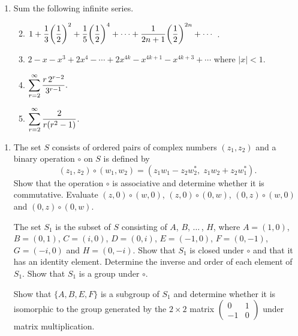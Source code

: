 \documentclass[a4, 11pt]{report}
\newlength{\qspace}
\newcounter{qnumber}
\newenvironment{question}%
 {\vspace{\qspace}
  \begin{enumerate}[\bfseries 1\quad][10]%
    \setcounter{enumi}{\value{qnumber}}%
    \item%
 }
{
  \end{enumerate}
  \filbreak
  \stepcounter{qnumber}
 }
\newenvironment{questionparts}[1][1]%
 {
  \begin{enumerate}[\bfseries (i)]%
    \setcounter{enumii}{#1}
    \addtocounter{enumii}{-1}
    \setlength{\itemsep}{5mm}
    \setlength{\parskip}{8pt}
 }
 {
  \end{enumerate}
 }
\begin{document}

\begin{question}
Sum the following infinite series.

\begin{questionparts}
	\item $\displaystyle 1 + 
{1 \over 3} \bigg({1\over 2}\bigg)^2 +{1 \over 5 }\bigg({1\over 2}\bigg)^4
+ \cdots + {1 \over 2n+1} \bigg({1 \over 2}\bigg)^{2n} + \cdots$ .

\item $\displaystyle 
2 -x -x^3 +2x^4 - \cdots + 2x^{4k} - x^{4k+1} - x^{4k+3} +\cdots$
where $|x|<1$.

\item  $\displaystyle  \sum _{r=2}^\infty
 {r\,  2^{r-2} \over 3^{r-1} }.$

\item $\displaystyle\sum_{r=2}^\infty
 {2 \over r(r^2-1) }$.
 \end{questionparts}
\end{question}


\begin{question}
The set $S$ consists of ordered pairs of complex numbers
$(z_1,z_2)$ and a binary operation  $\circ$ on $S$  is defined by
$$
(z_1,z_2)\circ(w_1,w_2)=
(z_1w_1-z_2w^*_2, \; z_1w_2+z_2w^*_1).
$$
Show that the operation $\circ$ is associative and determine whether
it is commutative. Evaluate $(z,0)\circ(w,0)$, $(z,0)\circ(0,w)$,
$(0,z)\circ(w,0)$ and $(0,z)\circ(0,w)$.

The set $S_1$ is the subset of $S$ consisting of $A$, $B$, $\ldots\,$, $H$,
where $A=(1,0)$, $B=(0,1)$, $C=(i,0)$, $D=(0,i)$, $E=(-1,0)$, $F=(0,-1)$,
$G=(-i,0)$ and $H=(0,-i)$. Show that $S_1$ is closed under $\circ$ and 
that it has an identity element. Determine the inverse and order of
each element of $S_1$. Show that $S_1$ is a group under 
$\circ$.
\hfil{}

Show that $\{A,B,E,F\}$ is a subgroup of $S_1$ and determine whether
it is isomorphic to the group generated by the $2\times2$ matrix
$\begin{pmatrix}0 & 1\\
-1 & 0
\end{pmatrix}$ under 
matrix multiplication.
	\end{question}
	
\end{document}
